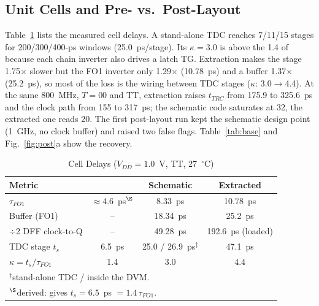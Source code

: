 \documentclass[conference]{IEEEtran}
\begin{document}
\subsection{Unit Cells and Pre- vs.\ Post-Layout}



Table~\ref{tab:unit} lists the measured cell delays. A stand-alone TDC reaches 7/11/15 stages for 200/300/400-ps windows (25.0~ps/stage). Its $\kappa=3.0$ is above the 1.4 of~\cite{bowman_tcas} because each chain inverter also drives a latch TG. Extraction makes the stage 1.75$\times$ slower but the FO1 inverter only 1.29$\times$ (10.78~ps) and a buffer 1.37$\times$ (25.2~ps), so most of the loss is the wiring between TDC stages ($\kappa$: 3.0$\to$4.4). At the same 800~MHz, $T{=}00$ and TT, extraction raises $t_{TRC}$ from 175.9 to 325.6~ps and the clock path from 155 to 317~ps; the schematic code saturates at 32, the extracted one reads 20. The first post-layout run kept the schematic design point (1~GHz, no clock buffer) and raised two false flags. Table~\ref{tab:base} and Fig.~\ref{fig:post}a show the recovery.

\begin{table}[!t]
\caption{Cell Delays ($V_{DD}=1.0$~V, TT, 27~$^\circ$C)}
\label{tab:unit}
\centering\footnotesize
\setlength{\tabcolsep}{3pt}
\begin{tabular}{lccc}
\toprule
Metric & \cite{bowman_tcas} & Schematic & Extracted \\
\midrule
$\tau_{FO1}$ & $\approx$4.6~ps$^\S$ & 8.33~ps & 10.78~ps \\
Buffer (FO1) & -- & 18.34~ps & 25.2~ps \\
$\div$2 DFF clock-to-Q & -- & 49.28~ps & 192.6~ps (loaded) \\
TDC stage $t_s$ & 6.5~ps & 25.0 / 26.9~ps$^\ddagger$ & 47.1~ps \\
$\kappa=t_s/\tau_{FO1}$ & 1.4 & 3.0 & 4.4 \\
\bottomrule
\multicolumn{4}{l}{$^\ddagger$stand-alone TDC / inside the DVM.}\\
\multicolumn{4}{l}{$^\S$derived: \cite{bowman_tcas} gives $t_s=6.5$~ps $=1.4\,\tau_{FO1}$.}
\end{tabular}
\end{table}
\end{document}
